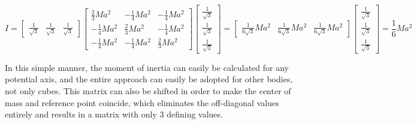 \[I = \begin{bmatrix}\frac{1}{\sqrt{3}} & \frac{1}{\sqrt{3}} & \frac{1}{\sqrt{3}}\end{bmatrix}\begin{bmatrix} \frac{2}{3}Ma^2 & -\frac{1}{4}Ma^2 & -\frac{1}{4}Ma^2 \\ -\frac{1}{4}Ma^2 & \frac{2}{3}Ma^2 & -\frac{1}{4}Ma^2 \\ -\frac{1}{4}Ma^2 & -\frac{1}{4}Ma^2 & \frac{2}{3}Ma^2\end{bmatrix}\begin{bmatrix}\frac{1}{\sqrt{3}} \\ \frac{1}{\sqrt{3}} \\ \frac{1}{\sqrt{3}}\end{bmatrix} = \begin{bmatrix}\frac{1}{6\sqrt{3}}Ma^2 & \frac{1}{6\sqrt{3}}Ma^2 & \frac{1}{6\sqrt{3}}Ma^2\end{bmatrix}\begin{bmatrix}\frac{1}{\sqrt{3}} \\ \frac{1}{\sqrt{3}} \\ \frac{1}{\sqrt{3}}\end{bmatrix} = \frac{1}{6}Ma^2\] 

In this simple manner, the moment of inertia can easily be calculated for any potential axis, and the entire approach can easily be adopted for other bodies, not only cubes. This matrix can also be shifted in order to make the center of mass and reference point coincide, which eliminates the off-diagonal values entirely and results in a matrix with only 3 defining values.